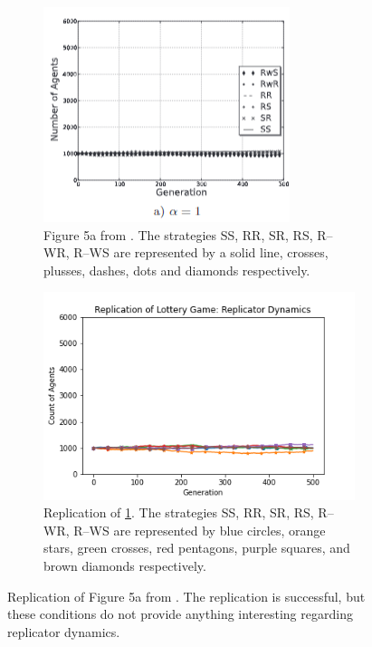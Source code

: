 \FloatBarrier 
\begin{figure}[!h]
  \begin{subfigure}[b]{0.45\textwidth}
    \includegraphics[width=\textwidth]{images/lottery1.png}
    \caption{Figure 5a from \cite{RN30}. The strategies SS, RR, SR, RS, R--WR, R--WS are represented by a solid line, crosses, plusses, dashes, dots and diamonds respectively. }
    \label{lottery1}
  \end{subfigure}
  \hfill
  \begin{subfigure}[b]{0.45\textwidth}
    \includegraphics[width=1.25\textwidth]{images/lottery1_me.png}
    \caption{Replication of \ref{lottery1}. The strategies SS, RR, SR, RS, R--WR, R--WS are represented by blue circles, orange stars, green crosses, red pentagons, purple squares, and brown diamonds respectively.}
    \label{lottery1_me}
  \end{subfigure}
  \caption{Replication of Figure 5a from \cite{RN30}. The replication is successful, but these conditions do not provide anything interesting regarding replicator dynamics.} \label{lottery_comp0}
\end{figure} 
\FloatBarrier

